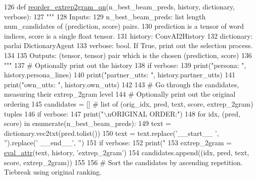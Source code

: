 \begin{DoxyCode}
126 \textcolor{keyword}{def }\hyperlink{namespaceprojects_1_1controllable__dialogue_1_1controllable__seq2seq_1_1util_aa1ba917d170af0191d23b033358bc9eb}{reorder\_extrep2gram\_qn}(n\_best\_beam\_preds, history, dictionary, verbose):
127     \textcolor{stringliteral}{"""}
128 \textcolor{stringliteral}{    Inputs:}
129 \textcolor{stringliteral}{        n\_best\_beam\_preds: list length num\_candidates of (prediction, score) pairs.}
130 \textcolor{stringliteral}{          prediction is a tensor of word indices, score is a single float tensor.}
131 \textcolor{stringliteral}{        history: ConvAI2History}
132 \textcolor{stringliteral}{        dictionary: parlai DictionaryAgent}
133 \textcolor{stringliteral}{        verbose: bool. If True, print out the selection process.}
134 \textcolor{stringliteral}{}
135 \textcolor{stringliteral}{    Outputs: (tensor, tensor) pair which is the chosen (prediction, score)}
136 \textcolor{stringliteral}{    """}
137     \textcolor{comment}{# Optionally print out the history}
138     \textcolor{keywordflow}{if} verbose:
139         print(\textcolor{stringliteral}{"persona: "}, history.persona\_lines)
140         print(\textcolor{stringliteral}{"partner\_utts: "}, history.partner\_utts)
141         print(\textcolor{stringliteral}{"own\_utts: "}, history.own\_utts)
142 
143     \textcolor{comment}{# Go through the candidates, measuring their extrep\_2gram level}
144     \textcolor{comment}{# Optionally print out the original ordering}
145     candidates = []  \textcolor{comment}{# list of (orig\_idx, pred, text, score, extrep\_2gram) tuples}
146     \textcolor{keywordflow}{if} verbose:
147         print(\textcolor{stringliteral}{"\(\backslash\)nORIGINAL ORDER:"})
148     \textcolor{keywordflow}{for} idx, (pred, score) \textcolor{keywordflow}{in} enumerate(n\_best\_beam\_preds):
149         text = dictionary.vec2txt(pred.tolist())
150         text = text.replace(\textcolor{stringliteral}{'\_\_start\_\_ '}, \textcolor{stringliteral}{''}).replace(\textcolor{stringliteral}{' \_\_end\_\_'}, \textcolor{stringliteral}{''})
151         \textcolor{keywordflow}{if} verbose:
152             print(\textcolor{stringliteral}{"%
153         extrep\_2gram = \hyperlink{namespaceprojects_1_1controllable__dialogue_1_1controllable__seq2seq_1_1controls_afc2b447cbf1dcb4a754d080d2e611c24}{eval\_attr}(text, history, \textcolor{stringliteral}{'extrep\_2gram'})
154         candidates.append((idx, pred, text, score, extrep\_2gram))
155 
156     \textcolor{comment}{# Sort the candidates by ascending repetition. Tiebreak using original ranking.}
}
\end{DoxyCode}
